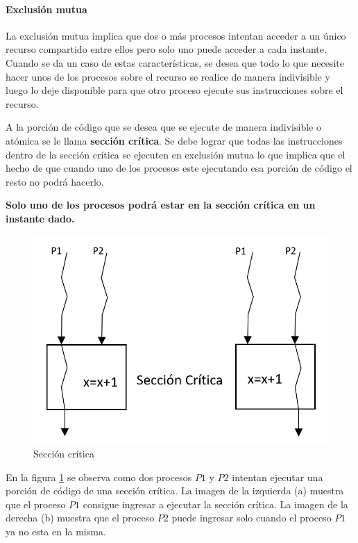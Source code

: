 \paragraph{Exclusión mutua}
La exclusión mutua implica que dos o más procesos intentan acceder a un único recurso compartido entre ellos pero solo uno puede acceder a cada instante.
Cuando se da un caso de estas características, se desea que todo lo que necesite hacer unos de los procesos sobre el recurso se realice de manera indivisible y luego lo deje disponible para que otro proceso ejecute sus instrucciones sobre el recurso.
\par A la porción de código que se desea que se ejecute de manera indivisible o atómica se le llama \textbf{sección crítica}. Se debe lograr que todas las instrucciones dentro de la sección crítica se ejecuten en exclusión mutua lo que implica que el hecho de que cuando uno de los procesos este ejecutando esa porción de código el resto no podrá hacerlo.

\textbf{Solo uno de los procesos podrá estar en la sección crítica en un instante dado.}

\begin{figure}[H]
    \centering
    \includegraphics[scale=0.4]{images/seccion_critica.jpg}
    \caption{Sección crítica}
    \label{fig:seccion_critica}
\end{figure}

En la figura \ref{fig:seccion_critica} se observa como dos procesos $P1$ y $P2$ intentan ejecutar una porción de código de una sección crítica. La imagen de la izquierda (a) muestra que el proceso $P1$ consigue ingresar a ejecutar la sección crítica. La imagen de la derecha (b) muestra que el proceso $P2$ puede ingresar solo cuando el proceso $P1$ ya no esta en la misma.

